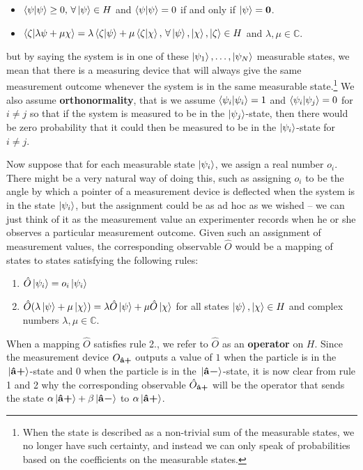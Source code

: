 {\begin{itemize}[topsep=0pt]
\item $\ip{\psi}{\psi}\geq 0,\, \forall \ket{\psi}\in H$ and $\ip{\psi}{\psi}=0$ if and only if $\ket{\psi}=\bm{0}$.
\item $\ip{\zeta}{\lambda\psi+\mu\chi}=\lambda\ip{\zeta}{\psi}+\mu\ip{\zeta}{\chi},\,\forall \ket{\psi},\ket{\chi},\ket{\zeta}\in H$ and  $\lambda,\mu\in\mathbb{C}$.
\end{itemize}} but by saying the system is in one of these $\ket{\psi_1},\ldots,\ket{\psi_N}$ measurable states, we mean that there is a measuring device that will always give the same measurement outcome whenever the system is in the same measurable state.\footnote{When the state is described as a non-trivial sum of the measurable states, we no longer have such certainty, and instead we can only speak of probabilities based on the coefficients on the measurable states.} We also assume \textbf{orthonormality}, that is we assume $\ip{\psi_i}{\psi_i}=1$ and $\ip{\psi_i}{\psi_j}=0$ for $i\neq j$ so that if the system is measured to be in the $\ket{\psi_j}$-state, then there would be zero probability that it could then be measured to be in the $\ket{\psi_i}$-state for $i\neq j$.  

Now suppose that for each measurable state $\ket{\psi_i}$, we assign a real number $o_i$. %
%
There might be a very natural way of doing this, such as assigning  $o_i$ to be the angle by which a pointer of a measurement device is deflected when the system is in the state $\ket{\psi_i}$,  %
%
but the assignment could be as ad hoc as we wished – we can just think of it as the measurement value an experimenter records when he or she observes a particular measurement outcome. Given such an assignment of measurement values, the corresponding observable $\hat{O}$ would be a mapping of states to states satisfying the following rules:
\begin{enumerate}[noitemsep, nosep, topsep=0pt]
\item $\hat{O}\ket{\psi_i}=o_i\ket{\psi_i}$
\item $\hat{O}(\lambda\ket{\psi}+\mu\ket{\chi})=\lambda\hat{O}\ket{\psi}+\mu\hat{O}\ket{\chi}$  for all states $\ket{\psi},\ket{\chi}\in H$ and complex numbers $\lambda,\mu\in\mathbb{C}$.
\end{enumerate}
When a mapping $\hat{O}$ satisfies rule 2., we refer to $\hat{O}$ as an \textbf{operator} on $H$. Since the measurement device $O_{{\vb{\hat{{a}}}\bm{+}}}$ outputs a value of $1$ when the particle is in the $\ket*{{\vb{\hat{{a}}}\bm{+}}}$-state and $0$ when the particle is in the $\ket*{{\vb{\hat{{a}}}\bm{-}}}$-state, it is now clear from rule 1 and 2 why the corresponding observable $\hat{O}_{{\vb{\hat{{a}}}\bm{+}}}$ will be the operator that sends the state $\alpha\ket*{{\vb{\hat{{a}}}\bm{+}}}+\beta\ket*{{\vb{\hat{{a}}}\bm{-}}}$ to $\alpha\ket*{{\vb{\hat{{a}}}\bm{+}}}$.

